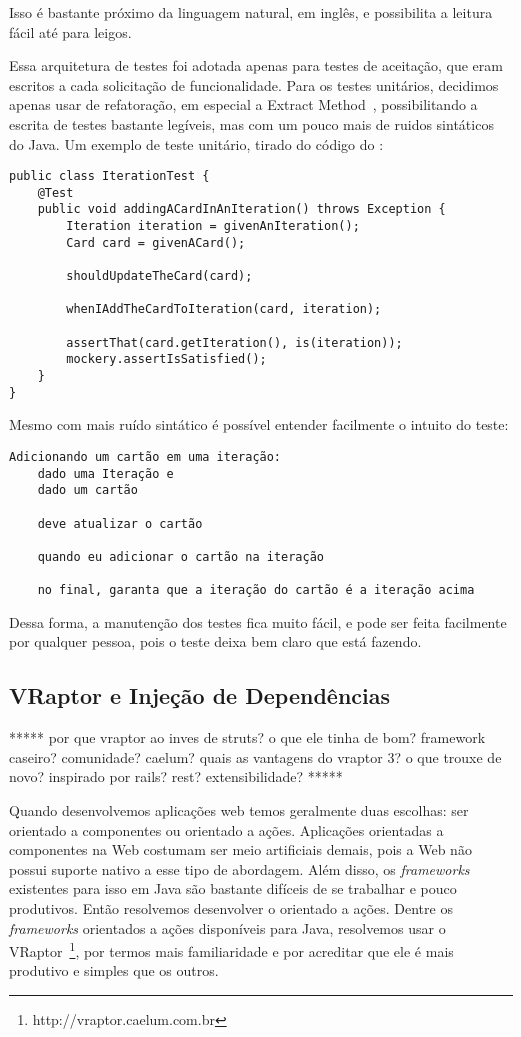 Isso é bastante próximo da linguagem natural, em inglês, e possibilita a leitura fácil até para leigos.

Essa arquitetura de testes foi adotada apenas para testes de aceitação, que eram escritos a cada solicitação de funcionalidade. Para os testes unitários, decidimos apenas usar de refatoração, em especial a Extract Method~\cite{refactoring}, possibilitando a escrita de testes bastante legíveis, mas com um pouco mais de ruidos sintáticos do Java. Um exemplo de teste unitário, tirado do código do \calopsita:

\begin{lstlisting}
public class IterationTest {
	@Test
	public void addingACardInAnIteration() throws Exception {
		Iteration iteration = givenAnIteration();
		Card card = givenACard();

		shouldUpdateTheCard(card);

		whenIAddTheCardToIteration(card, iteration);

		assertThat(card.getIteration(), is(iteration));
		mockery.assertIsSatisfied();
	}
}
\end{lstlisting}

Mesmo com mais ruído sintático é possível entender facilmente o intuito do teste:

\begin{verbatim}
Adicionando um cartão em uma iteração:
	dado uma Iteração e
	dado um cartão
  
	deve atualizar o cartão
  
	quando eu adicionar o cartão na iteração
  
	no final, garanta que a iteração do cartão é a iteração acima
\end{verbatim}

Dessa forma, a manutenção dos testes fica muito fácil, e pode ser feita facilmente por qualquer pessoa, pois o teste deixa bem claro que está fazendo.


\subsection{VRaptor e Injeção de Dependências}

*****
por que vraptor ao inves de struts? o que ele tinha de bom? framework caseiro? comunidade? caelum? quais as vantagens do vraptor 3? o que trouxe de novo? inspirado por rails? rest? extensibilidade?
*****

Quando desenvolvemos aplicações web temos geralmente duas escolhas: ser orientado a componentes ou orientado a ações. Aplicações orientadas a componentes na Web costumam ser meio artificiais demais, pois a Web não possui suporte nativo a esse tipo de abordagem. Além disso, os \textit{frameworks} existentes para isso em Java são bastante difíceis de se trabalhar e pouco produtivos. Então resolvemos desenvolver o \calopsita orientado a ações. Dentre os \textit{frameworks} orientados a ações disponíveis para Java, resolvemos usar o 
VRaptor~\footnote{http://vraptor.caelum.com.br}, por termos mais familiaridade e por acreditar que ele é mais produtivo e simples que os outros.

